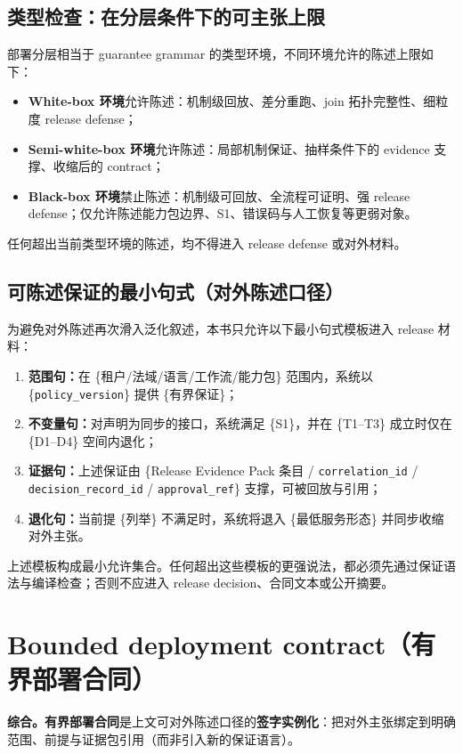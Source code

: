 \documentclass[11pt,a4paper]{report}
\begin{document}
\subsection{类型检查：在分层条件下的可主张上限}
部署分层相当于 guarantee grammar 的类型环境，不同环境允许的陈述上限如下：
\begin{itemize}
  \item \textbf{White-box 环境}允许陈述：机制级回放、差分重跑、join 拓扑完整性、细粒度 release defense；
  \item \textbf{Semi-white-box 环境}允许陈述：局部机制保证、抽样条件下的 evidence 支撑、收缩后的 contract；
  \item \textbf{Black-box 环境}禁止陈述：机制级可回放、全流程可证明、强 release defense；仅允许陈述能力包边界、S1、错误码与人工恢复等更弱对象。
\end{itemize}
\noindent 任何超出当前类型环境的陈述，均不得进入 release defense 或对外材料。

\subsection{可陈述保证的最小句式（对外陈述口径）}
为避免对外陈述再次滑入泛化叙述，本书只允许以下最小句式模板进入 release 材料：
\begin{enumerate}
  \item \textbf{范围句：}在 \{租户/法域/语言/工作流/能力包\} 范围内，系统以 \{\texttt{policy\_version}\} 提供 \{有界保证\}；
  \item \textbf{不变量句：}对声明为同步的接口，系统满足 \{S1\}，并在 \{T1--T3\} 成立时仅在 \{D1--D4\} 空间内退化；
  \item \textbf{证据句：}上述保证由 \{Release Evidence Pack 条目 / \texttt{correlation\_id} / \texttt{decision\_record\_id} / \texttt{approval\_ref}\} 支撑，可被回放与引用；
  \item \textbf{退化句：}当前提 \{列举\} 不满足时，系统将退入 \{最低服务形态\} 并同步收缩对外主张。
\end{enumerate}
\noindent 上述模板构成最小允许集合。任何超出这些模板的更强说法，都必须先通过保证语法与编译检查；否则不应进入 release decision、合同文本或公开摘要。


\section{Bounded deployment contract（有界部署合同）}
\textbf{综合。}\textbf{有界部署合同}是上文可对外陈述口径的\textbf{签字实例化}：把对外主张绑定到明确范围、前提与证据包引用（而非引入新的保证语言）。
\end{document}

